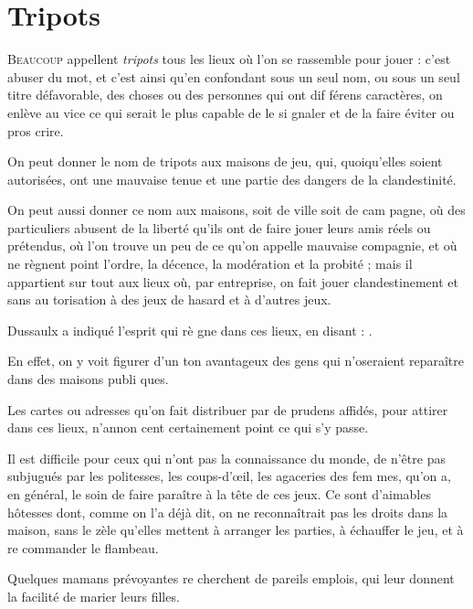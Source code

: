 \chapter{Tripots}


\lettrine{B}{eaucoup} appellent \emph{tripots} tous les
lieux où l'on se rassemble pour jouer :
c'est abuser du mot, et c'est ainsi 
qu'en confondant sous un seul nom,
ou sous un seul titre défavorable, des
choses ou des personnes qui ont dif%
férens caractères, on enlève au vice
ce qui serait le plus capable de le si%
gnaler et de la faire éviter ou pros%
crire.

On peut donner le nom de tripots
aux maisons de jeu, qui, quoiqu'elles
soient autorisées, ont une mauvaise
tenue et une partie des dangers de la
clandestinité.

On peut aussi donner ce nom aux
maisons, soit de ville soit de cam%
pagne, où des particuliers abusent de
la liberté qu'ils ont de faire jouer leurs
amis réels ou prétendus, où l'on trouve
un peu de ce qu'on appelle mauvaise
compagnie, et où ne règnent point
l'ordre, la décence, la modération et
la probité ; mais il appartient sur%
tout aux lieux où, par entreprise, on
fait jouer clandestinement et sans au%
torisation à des jeux de hasard et à
d'autres jeux.

Dussaulx a indiqué l'esprit qui rè%
gne dans ces lieux, en disant : .

En effet, on y voit figurer d'un ton
avantageux des gens qui n'oseraient
reparaître dans des maisons publi%
ques.

Les cartes ou adresses qu'on fait
distribuer par de prudens affidés,
pour attirer dans ces lieux, n'annon%
cent certainement point ce qui s'y 
passe.

Il est difficile pour ceux qui n'ont
pas la connaissance du monde, de
n'être pas subjugués par les politesses,
les coups-d'œil, les agaceries des fem%
mes, qu'on a, en général, le soin de
faire paraître à la tête de ces jeux. Ce
sont d'aimables hôtesses dont, comme
on l'a déjà dit, on ne reconnaîtrait
pas les droits dans la maison, sans le
zèle qu'elles mettent à arranger les
parties, à échauffer le jeu, et à re%
commander le flambeau.

Quelques mamans prévoyantes re%
cherchent de pareils emplois, qui 
leur donnent la facilité de marier
leurs filles.

